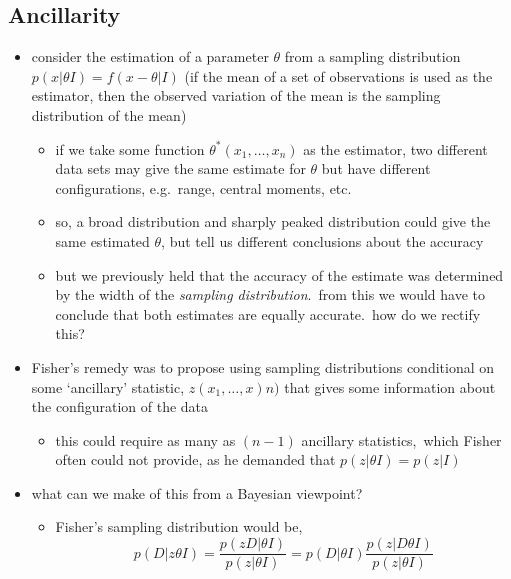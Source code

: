 \documentclass[../jaynes_prob_theory_notes.tex]{subfiles}
\begin{document}
        \subsection{Ancillarity}
            \begin{itemize}
                \item consider the estimation of a parameter $\theta$ from a sampling distribution $p(x|{\theta}I) = f(x - \theta | I)$ (if the mean of a set of observations is used as the estimator, then the observed variation of the mean is the sampling distribution of the mean)
                    \begin{itemize}
                        \item if we take some function ${\theta}^{*}(x_1, \ldots, x_n)$ as the estimator, two different data sets may give the same estimate for $\theta$ but have different configurations, e.g.\ range, central moments, etc.
                        \item so, a broad distribution and sharply peaked distribution could give the same estimated $\theta$, but tell us different conclusions about the accuracy
                        \item but we previously held that the accuracy of the estimate was determined by the width of the \textit{sampling distribution}.\ from this we would have to conclude that both estimates are equally accurate.\ how do we rectify this?
                    \end{itemize}
                \item Fisher's remedy was to propose using sampling distributions conditional on some `ancillary' statistic, $z(x_1, \ldots, x)n)$ that gives some information about the configuration of the data
                    \begin{itemize}
                        \item this could require as many as $(n-1)$ ancillary statistics,\ which Fisher often could not provide, as he demanded that $p(z|{\theta}I) = p(z|I)$
                    \end{itemize}
                \item what can we make of this from a Bayesian viewpoint?
                    \begin{itemize}
                        \item Fisher's sampling distribution would be,
                            \begin{equation*}
                                p(D|z{\theta}I) = \frac{p(zD|{\theta}I)}{p(z|{\theta}I)} = p(D|{\theta}I) \frac{p(z|D{\theta}I)}{p(z|{\theta}I)}

\end{equation*}
\end{itemize}
\end{itemize}
\end{document}
